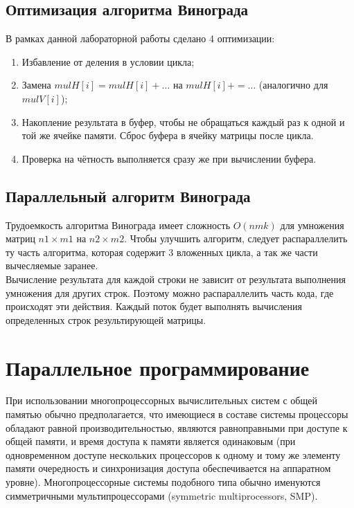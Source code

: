 \documentclass[12pt]{report}
\begin{document}
\subsection{Оптимизация алгоритма Винограда}
В рамках данной лабораторной работы сделано 4 оптимизации:
\begin{enumerate}
	\item Избавление от деления в условии цикла;
	\item Замена $mulH[i] = mulH[i] + …$ на $mulH[i] += …$ (аналогично для $mulV[i]$);
	\item Накопление результата в буфер, чтобы не обращаться каждый раз к одной и той же ячейке памяти. Сброс буфера в ячейку матрицы после цикла.
	\item Проверка на чётность выполняется сразу же при вычислении буфера.
\end{enumerate} 

\subsection{Параллельный алгоритм Винограда}
Трудоемкость алгоритма Винограда имеет сложность $O(nmk)$ для умножения матриц $n1 \times m1$ на $n2 \times m2$. Чтобы улучшить алгоритм, следует распараллелить ту часть алгоритма, которая содержит 3 вложенных цикла, а так же части вычесляемые заранее.\\

Вычисление результата для каждой строки не зависит от результата выполнения умножения для других строк. Поэтому можно распараллелить часть кода, где происходят эти действия. Каждый поток будет выполнять вычисления определенных строк результирующей матрицы.

\section{Параллельное программирование}

При использовании многопроцессорных вычислительных систем с общей памятью обычно предполагается, что имеющиеся в составе системы процессоры обладают равной производительностью, являются равноправными при доступе к общей памяти, и время доступа к памяти является одинаковым (при одновременном доступе нескольких процессоров к одному и тому же элементу памяти очередность и синхронизация доступа обеспечивается на аппаратном уровне). Многопроцессорные системы подобного типа обычно именуются симметричными мультипроцессорами (symmetric multiprocessors, SMP).
\end{document}
